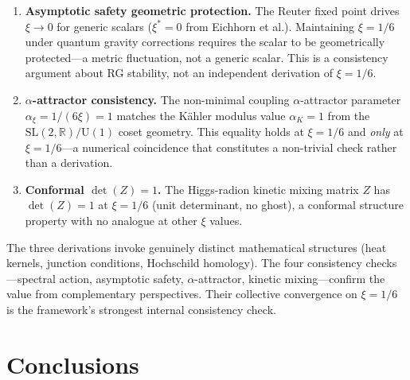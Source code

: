 \begin{remark}[Seven-fold convergence of $\xi = 1/6$: three derivations and four consistency checks]
\begin{enumerate}
\item \textbf{Asymptotic safety geometric protection.} The Reuter fixed point drives $\xi \to 0$ for generic scalars ($\xi^* = 0$ from Eichhorn et al.). Maintaining $\xi = 1/6$ under quantum gravity corrections requires the scalar to be geometrically protected---a metric fluctuation, not a generic scalar. This is a consistency argument about RG stability, not an independent derivation of $\xi = 1/6$.

\item \textbf{$\alpha$-attractor consistency.} The non-minimal coupling $\alpha$-attractor parameter $\alpha_\xi = 1/(6\xi) = 1$ matches the K\"ahler modulus value $\alpha_K = 1$ from the $\mathrm{SL}(2,\mathbb{R})/\mathrm{U}(1)$ coset geometry. This equality holds at $\xi = 1/6$ and \emph{only} at $\xi = 1/6$---a numerical coincidence that constitutes a non-trivial check rather than a derivation.

\item \textbf{Conformal $\det(Z) = 1$.} The Higgs-radion kinetic mixing matrix $Z$ has $\det(Z) = 1$ at $\xi = 1/6$ (unit determinant, no ghost), a conformal structure property with no analogue at other $\xi$ values.
\end{enumerate}
The three derivations invoke genuinely distinct mathematical structures (heat kernels, junction conditions, Hochschild homology). The four consistency checks---spectral action, asymptotic safety, $\alpha$-attractor, kinetic mixing---confirm the value from complementary perspectives. Their collective convergence on $\xi = 1/6$ is the framework's strongest internal consistency check.
\end{remark}


\section{Conclusions}
\label{sec:1-conclusions}

